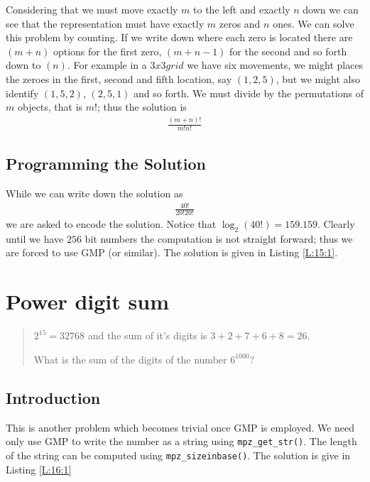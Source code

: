 \documentclass[oneside,12pt]{book}   	%
\newcounter{ex}
\newcounter{pr}
\theoremstyle{definition}
\begin{document}
\begin{spacing}{1.618}
			Considering that we must move exactly $m$ to the left and exactly $n$ down we can see that the representation must have exactly $m$ zeros and $n$ ones. We can solve this problem by counting. If we write down where each zero is located there are $(m+n)$ options for the first zero, $(m+n-1)$ for the second and so forth down to $(n)$. For example in a $3x3 grid$ we have six movements, we might places the zeroes in the first, second and fifth location, say $(1, 2, 5)$, but we might also identify $(1, 5, 2)$, $(2, 5, 1)$ and so forth. We must divide by the permutations of $m$ objects, that is $m!$; thus the solution is 
			\begin{alignat}{4}
				\frac{(m+n)!}{m!n!}
			\end{alignat}
		
		\section{Programming the Solution}
		
			While we can write down the solution as 
			\begin{alignat}{4}
				\frac{40!}{20!20!}
			\end{alignat}
			we are asked to encode the solution. Notice that $\log_2{(40!)}=159.159$. Clearly until we have $256$ bit numbers the computation is not straight forward; thus we are forced to use GMP (or similar). The solution is given in Listing \ref{L:15:1}. 
			
			
			
	\chapter{Power digit sum}
		\begin{quote}
			$2^{15}=32768$ and the sum of it's digits is $3+2+7+6+8=26$. 
			
			What is the sum of the digits of the number $6^{1000}$?
		\end{quote}
		\section{Introduction}
		
			This is another problem which becomes trivial once GMP is employed. We need only use GMP to write the number as a string using \texttt{mpz\_get\_str()}. The length of the string can be computed using \texttt{mpz\_sizeinbase()}. The solution is give in Listing \ref{L:16:1}
			

\end{spacing}
\end{document}
